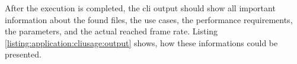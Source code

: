 

After the execution is completed, the \gls{cli} output should show all
important information about the found files, the use cases, the performance
requirements, the parameters, and the actual reached frame rate. Listing
\ref{listing:application:cliusage:output} shows, how these informations could be
presented.



